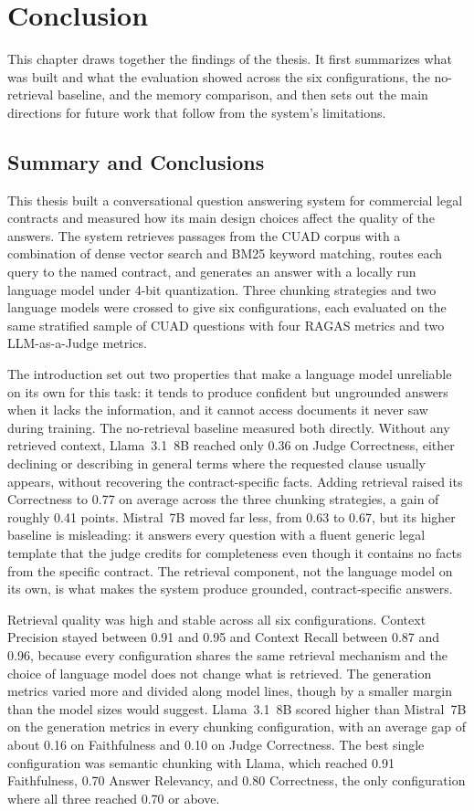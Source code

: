 \chapter{Conclusion}
\label{chap_last}

This chapter draws together the findings of the thesis. It first summarizes what was built and what the evaluation showed across the six configurations, the no-retrieval baseline, and the memory comparison, and then sets out the main directions for future work that follow from the system's limitations.


\section{Summary and Conclusions}
This thesis built a conversational question answering system for commercial legal contracts and measured how its main design choices affect the quality of the answers. The system retrieves passages from the CUAD corpus with a combination of dense vector search and BM25 keyword matching, routes each query to the named contract, and generates an answer with a locally run language model
under 4-bit quantization. Three chunking strategies and two language models were crossed to give six configurations, each evaluated on the same stratified sample of CUAD questions with four RAGAS metrics and two LLM-as-a-Judge metrics.

The introduction set out two properties that make a language model unreliable on its own for this task: it tends to produce confident but ungrounded answers when it lacks the information, and it cannot access documents it never saw during training. The no-retrieval baseline measured both directly. Without any retrieved context, Llama~3.1~8B reached only 0.36 on Judge Correctness, either declining or describing in general terms where the requested clause usually appears, without recovering the contract-specific facts. Adding retrieval raised its Correctness to 0.77 on average across the three chunking strategies, a gain of roughly 0.41 points. Mistral~7B moved far less, from 0.63 to 0.67, but its higher baseline is misleading: it answers every question with a fluent generic legal template that the judge credits for completeness even though it contains no facts from the specific contract. The retrieval component, not the language model on its own, is what makes the system produce grounded, contract-specific answers.

Retrieval quality was high and stable across all six configurations. Context Precision stayed between 0.91 and 0.95 and Context Recall between 0.87 and 0.96, because every configuration shares the same retrieval mechanism and the choice of language model does not change what is retrieved. The generation metrics varied more and divided along model lines, though by a smaller margin than the model sizes would suggest. Llama~3.1~8B scored higher than Mistral~7B on the generation metrics in every chunking configuration, with an average gap of about 0.16 on Faithfulness and 0.10 on Judge Correctness. The best single configuration was semantic chunking with Llama, which reached 0.91 Faithfulness, 0.70 Answer Relevancy, and 0.80 Correctness, the only configuration where all three reached 0.70 or above.

